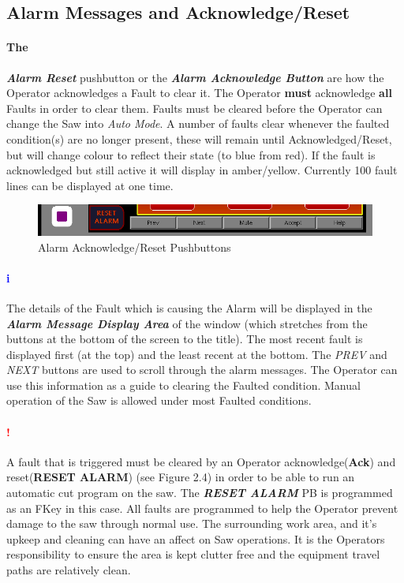 \subsection{Alarm Messages and Acknowledge/Reset} \paragraph*{The}\textbf{\textit{Alarm Reset}} pushbutton or the \textbf{\textit{Alarm Acknowledge Button}} are how the Operator acknowledges a Fault to clear it. The Operator \textbf{must} acknowledge \textbf{all} Faults in order to clear them. Faults must be cleared before the Operator can change the Saw into \textit{Auto Mode}. A number of faults clear whenever the faulted condition(s) are no longer present, these will remain until Acknowledged/Reset, but will change colour to reflect their state (to blue from red). If the fault is acknowledged but still active it will display in amber/yellow. Currently 100 fault lines can be displayed at one time. 
\begin{figure}
	\centering
	\includegraphics[width=.3\linewidth]{screen-captures/alarms/alarms-reset}
	\caption{Alarm Acknowledge/Reset Pushbuttons}
	\label{fig:alarm-reset}
\end{figure}
\paragraph*{\textbf{\LARGE \textcolor{blue}{i}}}The details of the Fault which is causing the Alarm will be displayed in the \textbf{\textit{Alarm Message Display Area}} of the window (which stretches from the buttons at the bottom of the screen to the title). The most recent fault is displayed first (at the top) and the least recent at the bottom. The \textit{PREV} and \textit{NEXT} buttons are used to scroll through the alarm messages. The Operator can use this information as a guide to clearing the Faulted condition. Manual operation of the Saw is allowed under most Faulted conditions.
\paragraph*{\textbf{{\LARGE \textcolor{red}{!}}}}A fault that is triggered must be cleared by an Operator acknowledge(\textbf{Ack}) and reset(\textbf{RESET ALARM}) (see Figure 2.4) in order to be able to run an automatic cut program on the saw. The \textbf{\textit{RESET ALARM}} PB is programmed as an FKey in this case. All faults are programmed to help the Operator prevent damage to the saw through normal use. The surrounding work area, and it's upkeep and cleaning can have an affect on Saw operations. It is the Operators responsibility to ensure the area is kept clutter free and the equipment travel paths are relatively clean.

